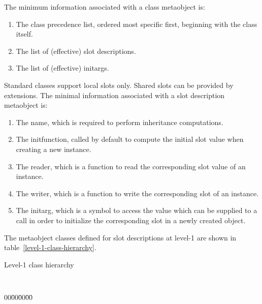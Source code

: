 \begin{optDefinition}
The minimum information associated with a class metaobject is:
%
\begin{enumerate}
    \item The class precedence list, ordered most specific first, beginning with
    the class itself.
    \item The list of (effective) slot descriptions.
    \item The list of (effective) initargs.
\end{enumerate}
%
Standard classes support local slots only. Shared slots can be provided by
extensions.  The minimal information associated with a slot description
metaobject is:
%
\begin{enumerate}
    \item The name, which is required to perform inheritance computations.
    \item The initfunction, called by default to compute the initial slot value
    when creating a new instance.
    \item The reader, which is a function to read the corresponding slot value
    of an instance.
    \item The writer, which is a function to write the corresponding slot of an
    instance.
    \item The initarg, which is a symbol to access the value which can be
    supplied to a  call in order to initialize the
    corresponding slot in a newly created object.
\end{enumerate}
%
The metaobject classes defined for slot descriptions at level-1 are shown in
table~\ref{level-1-class-hierarchy}.
%
\begin{table}
\caption{Level-1 class hierarchy}
\label{level-1-class-hierarchy}
{\tt
\begin{tabbing}
    00\=00\=00\=00\= \kill
     \\
    \> \\
    \>  \\
     \\
    \> \\
     \\
    \> \\
    \>\> \\
     \\
    \>
\end{tabbing}
}
\end{table}


\end{optDefinition}
